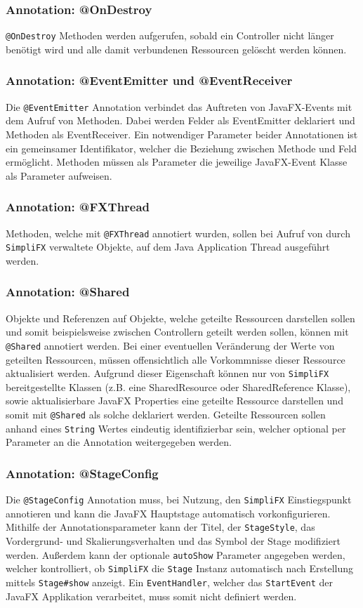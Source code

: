 \subsubsection{Annotation: @OnDestroy}
\texttt{@OnDestroy} Methoden werden aufgerufen, sobald ein Controller nicht länger benötigt wird und alle damit verbundenen Ressourcen gelöscht werden können.
\subsubsection{Annotation: @EventEmitter und @EventReceiver}
Die \texttt{@EventEmitter} Annotation verbindet das Auftreten von JavaFX-Events mit dem Aufruf von Methoden. Dabei werden Felder als EventEmitter deklariert und Methoden als EventReceiver. Ein notwendiger Parameter beider Annotationen ist ein gemeinsamer Identifikator, welcher die Beziehung zwischen Methode und Feld ermöglicht. Methoden müssen als Parameter die jeweilige JavaFX-Event Klasse als Parameter aufweisen.
\subsubsection{Annotation: @FXThread}
Methoden, welche mit \texttt{@FXThread} annotiert wurden, sollen bei Aufruf von durch \texttt{SimpliFX} verwaltete Objekte, auf dem Java Application Thread ausgeführt werden.
\subsubsection{Annotation: @Shared}
Objekte und Referenzen auf Objekte, welche geteilte Ressourcen darstellen sollen und somit beispielsweise zwischen Controllern geteilt werden sollen, können mit \texttt{@Shared} annotiert werden. Bei einer eventuellen Veränderung der Werte von geteilten Ressourcen, müssen offensichtlich alle Vorkommnisse dieser Ressource aktualisiert werden. Aufgrund dieser Eigenschaft können nur von \texttt{SimpliFX} bereitgestellte Klassen (z.B. eine SharedResource oder SharedReference Klasse), sowie aktualisierbare JavaFX Properties eine geteilte Ressource darstellen und somit mit \texttt{@Shared} als solche deklariert werden. Geteilte Ressourcen sollen anhand eines \texttt{String} Wertes eindeutig identifizierbar sein, welcher optional per Parameter an die Annotation weitergegeben werden.
\subsubsection{Annotation: @StageConfig}
Die \texttt{@StageConfig} Annotation muss, bei Nutzung, den \texttt{SimpliFX} Einstiegspunkt annotieren und kann die JavaFX Hauptstage automatisch vorkonfigurieren. Mithilfe der Annotationsparameter kann der Titel, der \texttt{StageStyle}, das Vordergrund- und Skalierungsverhalten und das Symbol der Stage modifiziert werden. Außerdem kann der optionale \texttt{autoShow} Parameter angegeben werden, welcher kontrolliert, ob \texttt{SimpliFX} die \texttt{Stage} Instanz automatisch nach Erstellung mittels \texttt{Stage\#show} anzeigt. Ein \texttt{EventHandler}, welcher das \texttt{StartEvent} der JavaFX Applikation verarbeitet, muss somit nicht definiert werden.
